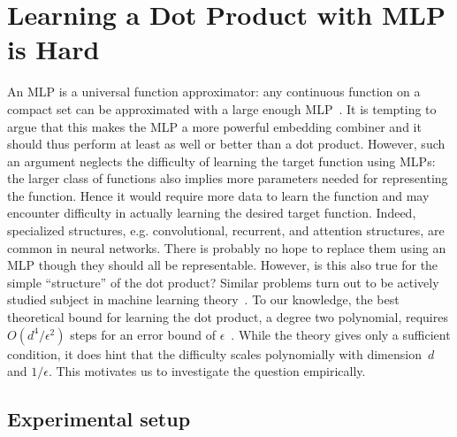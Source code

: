 \documentclass{article}
\begin{document}
\section{Learning a Dot Product with MLP is Hard}

An MLP is a universal function approximator: any continuous function on a compact set can be approximated with a large enough MLP~\cite{cybenko1989approximation,hornik1989multilayer,barron1993universal}.
It is tempting to argue that this makes the MLP a more powerful embedding combiner and it should thus perform at least as well or better than a dot product.
However, such an argument neglects the difficulty of learning the target function using MLPs: the larger class of functions also implies more parameters needed for representing the function.
Hence it would require more data to learn the function and may encounter difficulty in actually learning the desired target function.
Indeed, specialized structures, e.g. convolutional, recurrent, and attention structures, are common in neural networks.
There is probably no hope to replace them using an MLP though they should all be representable.
However, is this also true for the simple ``structure'' of the dot product?
Similar problems turn out to be actively studied subject in machine learning theory~\cite{andoni2014learning,li:nips17,du19c,allen-zhu19}.
To our knowledge, the best theoretical bound for learning the dot product, a degree two polynomial, requires $O(d^4/\epsilon^2)$ steps for an error bound of $\epsilon$~\cite{andoni2014learning}.
While the theory gives only a sufficient condition, it does hint that the difficulty scales polynomially with dimension~$d$ and $1/\epsilon$. This motivates us to investigate the question empirically.


\subsection{Experimental setup}
\label{sec:learning_dot}
\end{document}
